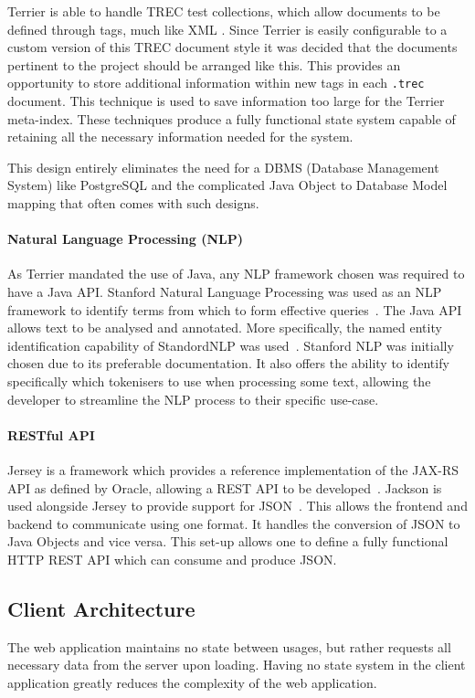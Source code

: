 \documentclass{l4proj}
\newcommand{\code}[1]{\texttt{#1}}
\begin{document}
Terrier is able to handle TREC test collections, which allow documents to be defined through tags, much like XML \cite{trecnist}.
Since Terrier is easily configurable to a custom version of this TREC document style it was decided that the documents pertinent to the project should be arranged like this.
This provides an opportunity to store additional information within new tags in each \code{.trec} document. This technique is used to save information too large for the Terrier meta-index.
These techniques produce a fully functional state system capable of retaining all the necessary information needed for the system.

This design entirely eliminates the need for a DBMS (Database Management System) like PostgreSQL and the complicated Java Object to Database Model mapping that often comes with such designs.

\paragraph{Natural Language Processing (NLP)}
As Terrier mandated the use of Java, any NLP framework chosen was required to have a Java API.
Stanford Natural Language Processing was used as an NLP framework to identify terms from which to form effective queries~\cite{manning-EtAl:2014:P14-5}. The Java API allows text to be analysed and annotated. More specifically, the named entity identification capability of StandordNLP was used~\cite{finkel2005incorporating}.
Stanford NLP was initially chosen due to its preferable documentation. It also offers the ability to identify specifically which tokenisers to use when processing some text, allowing the developer to streamline the NLP process to their specific use-case.

\paragraph{RESTful API}
Jersey is a framework which provides a reference implementation of the JAX-RS API as defined by Oracle, allowing a REST API to be developed~\cite{jersey,jaxrsapi}.
Jackson is used alongside Jersey to provide support for JSON~\cite{jackson}. This allows the frontend and backend to communicate using one format. It handles the conversion of JSON to Java Objects and vice versa.
This set-up allows one to define a fully functional HTTP REST API which can consume and produce JSON.

\subsection{Client Architecture}
The web application maintains no state between usages, but rather requests all necessary data from the server upon loading. Having no state system in the client application greatly reduces the complexity of the web application.
\end{document}
